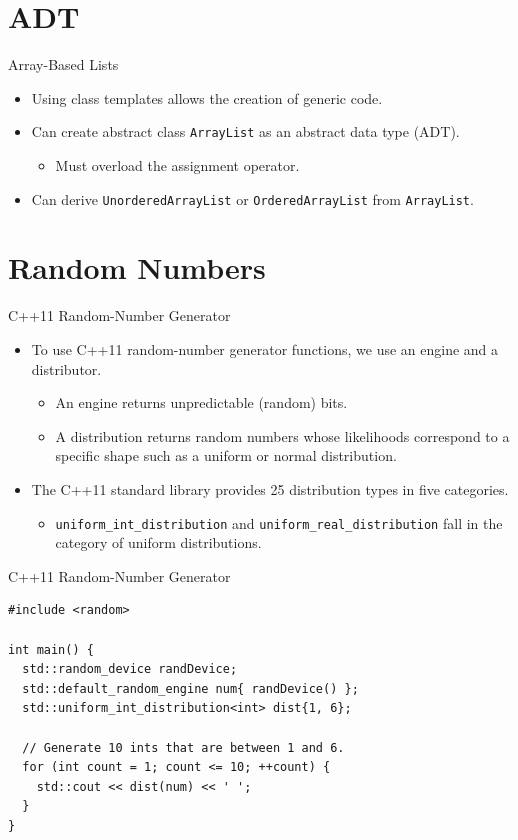 \documentclass[14pt,aspectratio=1610, hyperref={pdfpagelayout=SinglePage}]{beamer}
\begin{document}
\section*{ADT}
\begin{frame}{Array-Based Lists}
\protect\hypertarget{array-based-lists-revisited}{}
\begin{itemize}
\item
  Using class templates allows the creation of generic code.
\item
  Can create abstract class \lstinline{ArrayList} as an abstract data type (ADT).
  \begin{itemize}
  \item
    Must overload the assignment operator.
  \end{itemize}
\item
  Can derive \lstinline{UnorderedArrayList} or \lstinline{OrderedArrayList} from
  \lstinline{ArrayList}.
\end{itemize}
\end{frame}

\section{Random Numbers}
\begin{frame}[fragile]{C++11 Random-Number Generator}
\begin{itemize}
\item
  To use C++11 random-number generator functions, we use an engine and a
  distributor.
  \begin{itemize}
  \item
    An engine returns unpredictable (random) bits.
  \item
    A distribution returns random numbers whose likelihoods correspond to
    a specific shape such as a uniform or normal distribution.
  \end{itemize}
\item
  The C++11 standard library provides 25 distribution types in five
  categories.
  \begin{itemize}
  \item
    \lstinline{uniform_int_distribution} and
    \lstinline{uniform_real_distribution} fall in the category of uniform
    distributions.
  \end{itemize}
\end{itemize}
\end{frame}

\begin{frame}[fragile]{C++11 Random-Number Generator}
\begin{lstlisting}[basicstyle=\ttfamily\small]
#include <random>

int main() {
  std::random_device randDevice;
  std::default_random_engine num{ randDevice() };
  std::uniform_int_distribution<int> dist{1, 6};

  // Generate 10 ints that are between 1 and 6.
  for (int count = 1; count <= 10; ++count) {
    std::cout << dist(num) << ' ';
  }
}
\end{lstlisting}
\end{frame}
\end{document}
